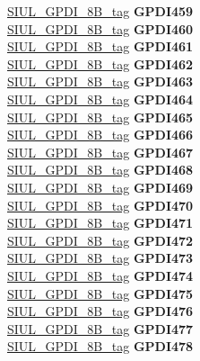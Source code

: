 \begin{DoxyCompactItemize}
\begin{tabbing}
\>\>\mbox{\hyperlink{unionSIUL__GPDI__8B__tag}{SIUL\_GPDI\_8B\_tag}} {\bfseries GPDI459}\\
\>\>\mbox{\hyperlink{unionSIUL__GPDI__8B__tag}{SIUL\_GPDI\_8B\_tag}} {\bfseries GPDI460}\\
\>\>\mbox{\hyperlink{unionSIUL__GPDI__8B__tag}{SIUL\_GPDI\_8B\_tag}} {\bfseries GPDI461}\\
\>\>\mbox{\hyperlink{unionSIUL__GPDI__8B__tag}{SIUL\_GPDI\_8B\_tag}} {\bfseries GPDI462}\\
\>\>\mbox{\hyperlink{unionSIUL__GPDI__8B__tag}{SIUL\_GPDI\_8B\_tag}} {\bfseries GPDI463}\\
\>\>\mbox{\hyperlink{unionSIUL__GPDI__8B__tag}{SIUL\_GPDI\_8B\_tag}} {\bfseries GPDI464}\\
\>\>\mbox{\hyperlink{unionSIUL__GPDI__8B__tag}{SIUL\_GPDI\_8B\_tag}} {\bfseries GPDI465}\\
\>\>\mbox{\hyperlink{unionSIUL__GPDI__8B__tag}{SIUL\_GPDI\_8B\_tag}} {\bfseries GPDI466}\\
\>\>\mbox{\hyperlink{unionSIUL__GPDI__8B__tag}{SIUL\_GPDI\_8B\_tag}} {\bfseries GPDI467}\\
\>\>\mbox{\hyperlink{unionSIUL__GPDI__8B__tag}{SIUL\_GPDI\_8B\_tag}} {\bfseries GPDI468}\\
\>\>\mbox{\hyperlink{unionSIUL__GPDI__8B__tag}{SIUL\_GPDI\_8B\_tag}} {\bfseries GPDI469}\\
\>\>\mbox{\hyperlink{unionSIUL__GPDI__8B__tag}{SIUL\_GPDI\_8B\_tag}} {\bfseries GPDI470}\\
\>\>\mbox{\hyperlink{unionSIUL__GPDI__8B__tag}{SIUL\_GPDI\_8B\_tag}} {\bfseries GPDI471}\\
\>\>\mbox{\hyperlink{unionSIUL__GPDI__8B__tag}{SIUL\_GPDI\_8B\_tag}} {\bfseries GPDI472}\\
\>\>\mbox{\hyperlink{unionSIUL__GPDI__8B__tag}{SIUL\_GPDI\_8B\_tag}} {\bfseries GPDI473}\\
\>\>\mbox{\hyperlink{unionSIUL__GPDI__8B__tag}{SIUL\_GPDI\_8B\_tag}} {\bfseries GPDI474}\\
\>\>\mbox{\hyperlink{unionSIUL__GPDI__8B__tag}{SIUL\_GPDI\_8B\_tag}} {\bfseries GPDI475}\\
\>\>\mbox{\hyperlink{unionSIUL__GPDI__8B__tag}{SIUL\_GPDI\_8B\_tag}} {\bfseries GPDI476}\\
\>\>\mbox{\hyperlink{unionSIUL__GPDI__8B__tag}{SIUL\_GPDI\_8B\_tag}} {\bfseries GPDI477}\\
\>\>\mbox{\hyperlink{unionSIUL__GPDI__8B__tag}{SIUL\_GPDI\_8B\_tag}} {\bfseries GPDI478}\\

\end{tabbing}
\end{DoxyCompactItemize}
